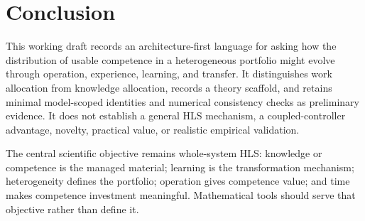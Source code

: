 \section{Conclusion}

This working draft records an architecture-first language for asking how the distribution of usable competence in a heterogeneous portfolio might evolve through operation, experience, learning, and transfer. It distinguishes work allocation from knowledge allocation, records a theory scaffold, and retains minimal model-scoped identities and numerical consistency checks as preliminary evidence. It does not establish a general HLS mechanism, a coupled-controller advantage, novelty, practical value, or realistic empirical validation.

The central scientific objective remains whole-system HLS: knowledge or competence is the managed material; learning is the transformation mechanism; heterogeneity defines the portfolio; operation gives competence value; and time makes competence investment meaningful. Mathematical tools should serve that objective rather than define it.
